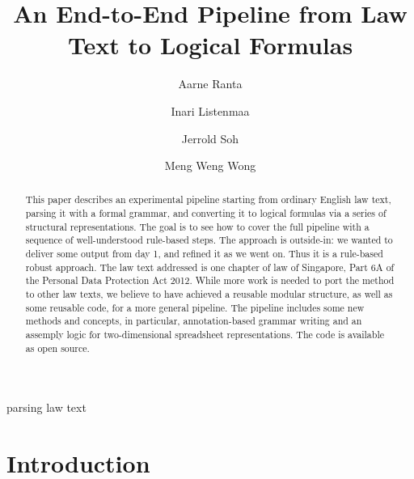 \documentclass{IOS-Book-Article}
\def\hb{\hbox to 11.5 cm{}}
\begin{document}
\pagestyle{headings}
\def\thepage{}
\begin{frontmatter}              %

\title{An End-to-End Pipeline from Law Text to Logical Formulas}

\markboth{}{August 2022\hb}

\author[A]{Aarne Ranta}
\author[B]{Inari Listenmaa}
\author[C]{Jerrold Soh}
\author[D]{Meng Weng Wong}

\address[A]{
  Department of Computer Science and Engineering,
  Chalmers University of Technology and University of Gothenburg,
  aarne.ranta@cse.gu.se 
  }
\address[B]{SMU and Digital Grammars}
\address[C]{SMU}
\address[D]{SMU}

\begin{abstract}
This paper describes an experimental pipeline starting from ordinary English law text, parsing it with a formal grammar, and converting it to logical formulas via a series of structural representations.
The goal is to see how to cover the full pipeline with a sequence of well-understood rule-based steps.
The approach is outside-in: we wanted to deliver some output from day 1, and refined it as we went on.
Thus it is a rule-based robust approach.
The law text addressed is one chapter of law of Singapore, Part 6A of the Personal Data Protection Act 2012.
While more work is needed to port the method to other law texts, we believe to have achieved a reusable modular structure, as well as some reusable code, for a more general pipeline.
The pipeline includes some new methods and concepts, in particular, annotation-based grammar writing and an assemply logic for two-dimensional spreadsheet representations.
The code is available as open source.
\end{abstract}


\begin{keyword}
parsing law text
\end{keyword}
\end{frontmatter}
\markboth{August 2022\hb}{August 2022\hb}





\section{Introduction}
\end{document}
